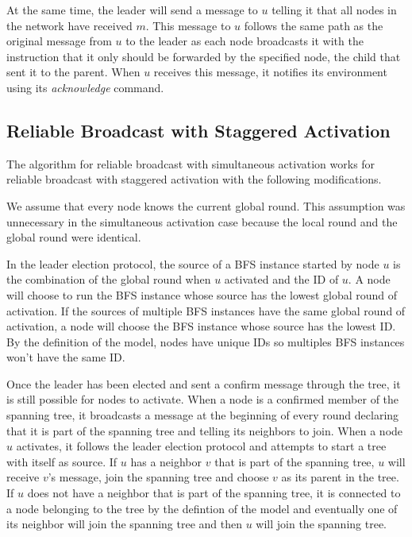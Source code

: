 \documentclass[english]{article}
\begin{document}
At the same time, the leader will send a message to $u$ telling it that all nodes in the network have received $m$. This message to $u$ follows the same path as the original message from $u$ to the leader as each node broadcasts it with the instruction that it only should be forwarded by the specified node, the child that sent it to the parent. When $u$ receives this message, it notifies its environment using its \textit{acknowledge} command.


  \subsection {Reliable Broadcast with Staggered Activation}

The algorithm for reliable broadcast with simultaneous activation works for reliable broadcast with staggered activation with the following modifications.

We assume that every node knows the current global round. This assumption was unnecessary in the simultaneous activation case because the local round and the global round were identical.

In the leader election protocol, the source of a BFS instance started by node $u$ is the combination of the global round when $u$ activated and the ID of $u$. A node will choose to run the BFS instance whose source has the lowest global round of activation. If the sources of multiple BFS instances have the same global round of activation, a node will choose the BFS instance whose source has the lowest ID. By the definition of the model, nodes have unique IDs so multiples BFS instances won't have the same ID.

Once the leader has been elected and sent a confirm message through the tree, it is still possible for nodes to activate. When a node is a confirmed member of the spanning tree, it broadcasts a message at the beginning of every round declaring that it is part of the spanning tree and telling its neighbors to join. When a node $u$ activates, it follows the leader election protocol and attempts to start a tree with itself as source. If $u$ has a neighbor $v$ that is part of the spanning tree, $u$ will receive $v$'s message, join the spanning tree and choose $v$ as its parent in the tree. If $u$ does not have a neighbor that is part of the spanning tree, it is connected to a node belonging to the tree by the defintion of the model and eventually one of its neighbor will join the spanning tree and then $u$ will join the spanning tree.
\end{document}
